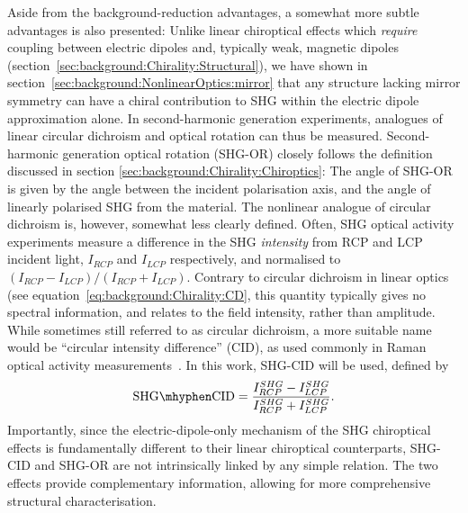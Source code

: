 Aside from the background-reduction advantages, a somewhat more subtle advantages is also presented: Unlike linear chiroptical effects which \textit{require} coupling between electric dipoles and, typically weak, magnetic dipoles (section~\ref{sec:background:Chirality:Structural}), we have shown in section~\ref{sec:background:NonlinearOptics:mirror} that any structure lacking mirror symmetry can have a chiral contribution to SHG within the electric dipole approximation alone. 
In second-harmonic generation experiments, analogues of linear circular dichroism and optical rotation can thus be measured. Second-harmonic generation optical rotation (SHG-OR) closely follows the definition discussed in section \ref{sec:background:Chirality:Chiroptics}: The angle of SHG-OR is given by the angle between the incident polarisation axis, and the angle of linearly polarised SHG from the material. The nonlinear analogue of circular dichroism is, however, somewhat less clearly defined. Often, SHG optical activity experiments measure a difference in the SHG \textit{intensity} from RCP and LCP incident light, $I_{RCP}$ and $I_{LCP}$ respectively, and normalised to $(I_{RCP} - I_{LCP})/(I_{RCP} + I_{LCP})$. Contrary to circular dichroism in linear optics (see equation~\ref{eq:background:Chirality:CD}, this quantity typically gives no spectral information, and relates to the field intensity, rather than amplitude. While sometimes still referred to as circular dichroism, a more suitable name would be ``circular intensity difference'' (CID), as used commonly in Raman optical activity measurements~\cite[\S 1.4]{Barron2004}. In this work, SHG-CID will be used, defined by
\begin{equation}\label{eq:background:NonlinearOptics:CID}	
	\mathrm{SHG \mhyphen CID} = \frac{I_{RCP}^{SHG} - I_{LCP}^{SHG}}{I_{RCP}^{SHG} + I_{LCP}^{SHG}}.
\end{equation}
Importantly, since the electric-dipole-only mechanism of the SHG chiroptical effects is fundamentally different to their linear chiroptical counterparts, SHG-CID and SHG-OR are not intrinsically linked by any simple relation. The two effects provide complementary information, allowing for more comprehensive structural characterisation.

